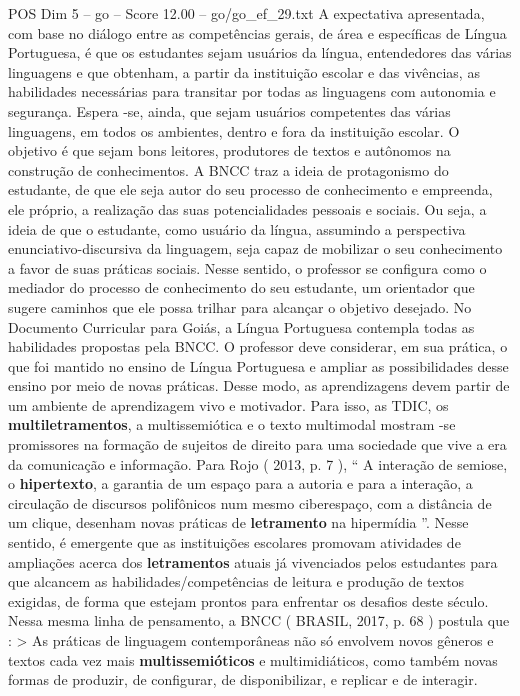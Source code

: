 \begin{textsample}{POS Dim 5 – go – Score 12.00 – go/go\_ef\_29.txt}  \label{ex:f5_pos_002}
A expectativa apresentada, com base no diálogo entre as competências gerais, de área e específicas de Língua Portuguesa, é que os estudantes sejam usuários da língua, entendedores das várias linguagens e que obtenham, a partir da instituição escolar e das vivências, as habilidades necessárias para transitar por todas as linguagens com autonomia e segurança.
Espera -se, ainda, que sejam usuários competentes das várias linguagens, em todos os ambientes, dentro e fora da instituição escolar.
O objetivo é que sejam bons leitores, produtores de textos e autônomos na construção de conhecimentos.
A BNCC traz a ideia de protagonismo do estudante, de que ele seja autor do seu processo de conhecimento e empreenda, ele próprio, a realização das suas potencialidades pessoais e sociais.
Ou seja, a ideia de que o estudante, como usuário da língua, assumindo a perspectiva enunciativo-discursiva da linguagem, seja capaz de mobilizar o seu conhecimento a favor de suas práticas sociais.
Nesse sentido, o professor se configura como o mediador do processo de conhecimento do seu estudante, um orientador que sugere caminhos que ele possa trilhar para alcançar o objetivo desejado.
No Documento Curricular para Goiás, a Língua Portuguesa contempla todas as habilidades propostas pela BNCC.
O professor deve considerar, em sua prática, o que foi mantido no ensino de Língua Portuguesa e ampliar as possibilidades desse ensino por meio de novas práticas.
Desse modo, as aprendizagens devem partir de um ambiente de aprendizagem vivo e motivador.
Para isso, as TDIC, os \textbf{multiletramentos}, a multissemiótica e o texto multimodal mostram -se promissores na formação de sujeitos de direito para uma sociedade que vive a era da comunicação e informação.
Para Rojo ( 2013, p. 7 ), “ A interação de semiose, o \textbf{hipertexto}, a garantia de um espaço para a autoria e para a interação, a circulação de discursos polifônicos num mesmo ciberespaço, com a distância de um clique, desenham novas práticas de \textbf{letramento} na hipermídia ”.
Nesse sentido, é emergente que as instituições escolares promovam atividades de ampliações acerca dos \textbf{letramentos} atuais já vivenciados pelos estudantes para que alcancem as habilidades/competências de leitura e produção de textos exigidas, de forma que estejam prontos para enfrentar os desafios deste século.
Nessa mesma linha de pensamento, a BNCC ( BRASIL, 2017, p. 68 ) postula que : > As práticas de linguagem contemporâneas não só envolvem novos gêneros e textos cada vez mais \textbf{multissemióticos} e multimidiáticos, como também novas formas de produzir, de configurar, de disponibilizar, e replicar e de interagir.

\end{textsample}
